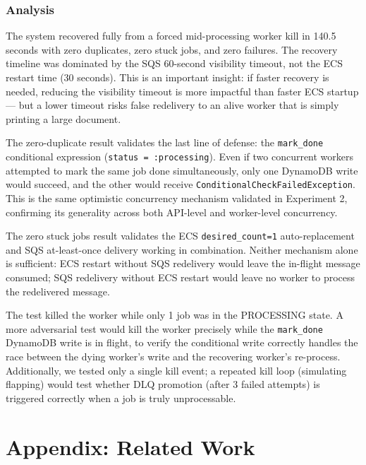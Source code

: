 \documentclass[11pt,letterpaper]{article}
\newcommand{\code}[1]{\texttt{\small #1}}
\begin{document}
\subsubsection{Analysis}

\begin{resultbox}
The system recovered fully from a forced mid-processing worker kill in 140.5 seconds with zero duplicates, zero stuck jobs, and zero failures. The recovery timeline was dominated by the SQS 60-second visibility timeout, not the ECS restart time (30 seconds). This is an important insight: if faster recovery is needed, reducing the visibility timeout is more impactful than faster ECS startup --- but a lower timeout risks false redelivery to an alive worker that is simply printing a large document.

The zero-duplicate result validates the last line of defense: the \code{mark\_done} conditional expression (\code{status = :processing}). Even if two concurrent workers attempted to mark the same job done simultaneously, only one DynamoDB write would succeed, and the other would receive \code{ConditionalCheckFailedException}. This is the same optimistic concurrency mechanism validated in Experiment 2, confirming its generality across both API-level and worker-level concurrency.

The zero stuck jobs result validates the ECS \code{desired\_count=1} auto-replacement and SQS at-least-once delivery working in combination. Neither mechanism alone is sufficient: ECS restart without SQS redelivery would leave the in-flight message consumed; SQS redelivery without ECS restart would leave no worker to process the redelivered message.
\end{resultbox}

\begin{limitbox}
The test killed the worker while only 1 job was in the PROCESSING state. A more adversarial test would kill the worker precisely while the \code{mark\_done} DynamoDB write is in flight, to verify the conditional write correctly handles the race between the dying worker's write and the recovering worker's re-process. Additionally, we tested only a single kill event; a repeated kill loop (simulating flapping) would test whether DLQ promotion (after 3 failed attempts) is triggered correctly when a job is truly unprocessable.
\end{limitbox}


\section*{Appendix: Related Work}
\end{document}
